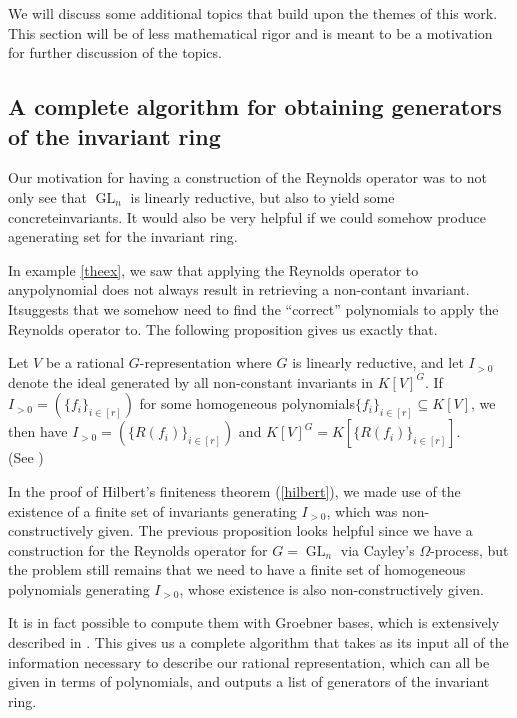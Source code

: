 We will discuss some additional topics that build upon the themes of this work.
This section will be of less mathematical rigor and is meant to be a motivation for further discussion of the topics.

\subsection{A complete algorithm for obtaining generators of the invariant ring}
Our motivation for having a construction of the Reynolds operator was to not only see that $\operatorname{GL}_n$ is linearly reductive, but also to yield some concrete\linebreak invariants.
It would also be very helpful if we could somehow produce a\linebreak generating set for the invariant ring.

In example \ref{theex}, we saw that applying the Reynolds operator to any\linebreak polynomial does not always result in retrieving a non-contant invariant.
It\linebreak suggests that we somehow need to find the ``correct'' polynomials to apply the Reynolds operator to.
The following proposition gives us exactly that.
\begin{proposition}
  Let $V$ be a rational $G$-representation where $G$ is linearly reductive, and let $I_{>0}$ denote the ideal generated by all non-constant invariants in $K[V]^G$.
  If $I_{>0} = \left(\{f_i\}_{i \in[r]}\right)$ for some homogeneous polynomials\linebreak $\{f_i\}_{i\in[r]} \subseteq K[V]$, we then have $I_{>0} = \left(\{R(f_i)\}_{i\in[r]}\right)$ and $K[V]^G = K\left[\{R(f_i)\}_{i\in[r]}\right]$.  \\
  (See \cite[prop. 4.1.1]{DK15})
\end{proposition}
In the proof of Hilbert's finiteness theorem (\ref{hilbert}), we made use of the existence of a finite set of invariants generating $I_{>0}$, which was non-constructively given.
The previous proposition looks helpful since we have a construction for the Reynolds operator for $G=\operatorname{GL}_n$ via Cayley's $\Omega$-process, but the problem still remains that we need to have a finite set of homogeneous polynomials generating $I_{>0}$, whose existence is also non-constructively given.

It is in fact possible to compute them with Groebner bases, which is extensively described in \cite[4.1.9]{DK15}.
This gives us a complete algorithm that takes as its input all of the information necessary to describe our rational representation, which can all be given in terms of polynomials, and outputs a list of generators of the invariant ring.

